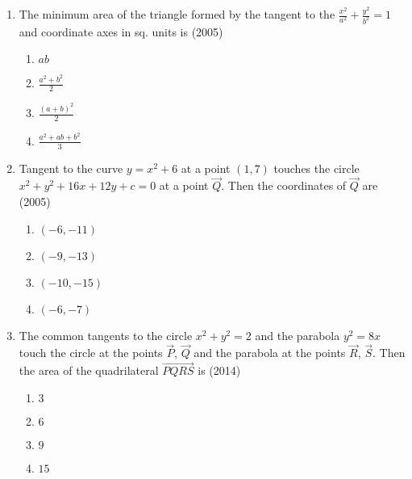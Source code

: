\begin{enumerate}
\begin{multicols}{4}
\begin{enumerate}
    \item $\brak{-2,\sqrt{6}}$
    \item $\brak{-5,2\sqrt{6}}$
    \item $\brak{\frac{1}{2},\frac{1}{\sqrt{6}}}$
    \item $\brak{4,-\sqrt{6}}$
\end{enumerate}
\end{multicols}
\item The minimum area of the triangle formed by the tangent to the $\frac{x^{2}}{a^{2}}+\frac{y^{2}}{b^{2}}=1$ and coordinate axes in sq. units is \hfill{(2005)}
\begin{multicols}{4}
\begin{enumerate}
    \item $ab$ 
    \item $\frac{a^{2}+b^{2}}{2}$ 
    \item $\frac{(a+b)^{2}}{2}$ 
    \item $\frac{a^{2}+ab+b^{2}}{3}$ 
\end{enumerate}
\end{multicols}
\item Tangent to the curve $y=x^{2}+6$ at a point ${(1,7)}$ touches the circle $x^{2}+y^{2}+16x+12y+c=0$ at a point $\vec{Q}$. Then the coordinates of $\vec{Q}$ are \hfill{(2005)}
\begin{multicols}{4}
\begin{enumerate}
    \item${(-6,-11)}$
    \item${(-9,-13)}$
    \item${(-10,-15)}$
    \item${(-6,-7)}$
\end{enumerate}
\end{multicols}
	\item The common tangents to the circle $x^2+y^2=2$ and the parabola $y^2=8x$ touch the circle at the points $\vec{P}$, $\vec{Q}$ and the parabola at the points $\vec{R}$, $\vec{S}$. Then the area of the quadrilateral $\vec{PQRS}$ is \hfill(2014)
		\begin{multicols}{4}
\begin{enumerate}
			\item $3$
			\item $6$
				\columnbreak
			\item $9$
			\item $15$
		\end{enumerate}
\end{multicols}

\end{enumerate}
